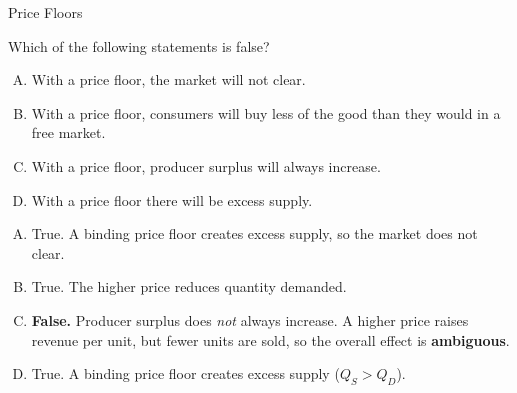 \documentclass{beamer}
\begin{document}
\begin{frame}{Price Floors}


  Which of the following statements is false?

  \bigskip
  \begin{enumerate}[A)]
    \item With a price floor, the market will not clear.
    \item With a price floor, consumers will buy less of the good than they would in a free market.
    \item With a price floor, producer surplus will always increase.
    \item With a price floor there will be excess supply.
  \end{enumerate}
\end{frame}

\begin{frame}


\bigskip

  \begin{enumerate}[A)]
    \item  True. A binding price floor creates excess supply, so the market does not clear.
    
    \item  True. The higher price reduces quantity demanded.
    
    \item \textbf{False.} Producer surplus does \emph{not} always increase. A higher price raises revenue per unit, but fewer units are sold, so the overall effect is \textbf{ambiguous}.
    
    \item  True. A binding price floor creates excess supply ($Q_S>Q_D$).
\end{enumerate}

\bigskip
\begin{center}
\end{center}

\end{frame}
\end{document}

